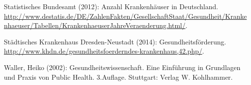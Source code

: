 \begin{thebibliography}{99}
	Statistisches Bundesamt (2012): Anzahl Krankenhäuser in Deutschland. \url{http://www.destatis.de/DE/ZahlenFakten/GesellschaftStaat/Gesundheit/Krankenhaeuser/Tabellen/KrankenhaeuserJahreVeraenderung.html/}.
	
	Städtisches Krankenhaus Dresden-Neustadt (2014): Gesundheitsförderung. \url{http://www.khdn.de/gesundheitsfoerderndes-krankenhaus,42.php/}.
	
	Waller, Heiko (2002): Gesundheitswissenschaft. Eine Einführung in Grundlagen und Praxis von Public Health. 3.Auflage. Stuttgart: Verlag W. Kohlhammer.
\end{thebibliography}
